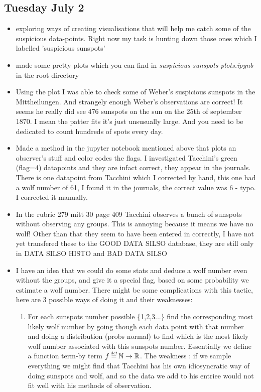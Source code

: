 \documentclass[12pt]{article}
\newcommand{\N}{\mathbb{N}}
\newcommand{\R}{\mathbb{R}}
\newcommand\defeq{\mathrel{\stackrel{\makebox[0pt]{\mbox{\normalfont\tiny def}}}{=}}}
\begin{document}
\subsection{Tuesday July 2}
\begin{itemize}
    \item exploring ways of creating visualisations that will help me catch some of the suspicious data-points. Right now my task is hunting down those ones which I labelled 'suspicious sunspots'
    \item made some pretty plots which you can find in \textit{suspicious sunspots plots.ipynb} in the root directory
    \item Using the plot I was able to check some of Weber's suspicious sunspots in the Mittheilungen. And strangely enough Weber's observations are correct! It seems he really did see 476 sunspots on the sun on the 25th of september 1870. I mean the patter fits it's just unsusually large. And you need to be dedicated to count hundreds of spots every day.
    \item Made a method in the jupyter notebook mentioned above that plots an observer's stuff and color codes the flags. I investigated Tacchini's green (flag=4) datapoints and they are infact correct, they appear in the journals. There is one datapoint from Tacchini which I corrected by hand, this one had a wolf number of 61, I found it in the journals, the correct value was 6 - typo. I corrected it manually.
    \item In the rubric 279 mitt 30 page 409 Tacchini observes a bunch of sunspots without observing any groups. This is annoying because it means we have no wolf! Other than that they seem to have been entered in correctly, I have not yet transfered these to the GOOD DATA SILSO database, they are still only in DATA SILSO HISTO and BAD DATA SILSO
    \item I have an idea that we could do some stats and deduce a wolf number even without the groups, and give it a special flag, based on some probability we estimate a wolf number. There might be some complications with this tactic, here are 3 possible ways of doing it and their weaknesses:
    \begin{enumerate}
        \item For each sunspots number possible \{1,2,3...\} find the corresponding most likely wolf number by going though each data point with that number and doing a distribution (probs normal) to find which is the most likely wolf number associated with this sunspots number. Essentially we define a function term-by term $f \defeq{} \N \to \R$. The weakness : if we sample everything we might find that Tacchini has his own idiosyncratic way of doing sunspots and wolf, and so the data we add to his entriee would not fit well with his methods of observation.

\end{enumerate}
\end{itemize}
\end{document}
